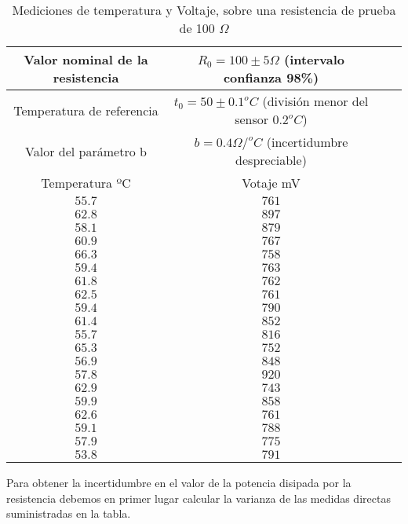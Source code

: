 \begin{table}[h]
\caption{Mediciones de temperatura y Voltaje, sobre una resistencia de prueba de 100 $\Omega$}
\label{tabres}
\centering
\begin{tabular}{cccc}
\hline
Valor nominal de la resistencia& $R_0=100 \pm 5 \Omega$ (intervalo confianza 98\%) \\ 
\hline
Temperatura de referencia& $t_0=50\pm 0.1 ^oC$ (división menor del sensor $0.2^oC$) \\
\hline
Valor del parámetro b& $b = 0.4\Omega / ^oC$ (incertidumbre despreciable)\\
\hline
\hline
Temperatura ºC& Votaje mV\\
\hline
 $55.7$&$761$\\
\hline 
 $62.8$&$897$\\
\hline 
 $58.1$&$879$\\
\hline 
 $60.9$&$767$\\
\hline 
 $66.3$&$758$\\
\hline 
 $59.4$&$763$\\
\hline 
 $61.8$&$762$\\
\hline 
 $62.5$&$761$\\
\hline 
 $59.4$&$790$\\
\hline 
 $61.4$&$852$\\
\hline 
 $55.7$&$816$\\
\hline 
 $65.3$&$752$\\
\hline 
 $56.9$&$848$\\
\hline 
 $57.8$&$920$\\
\hline 
 $62.9$&$743$\\
\hline 
 $59.9$&$858$\\
\hline 
 $62.6$&$761$\\
\hline 
 $59.1$&$788$\\
\hline 
 $57.9$&$775$\\
\hline
 $53.8$&$791$\\
\hline
\hline
\end{tabular}
\end{table}

Para obtener la incertidumbre en el valor de la potencia disipada por la resistencia debemos en primer lugar calcular la varianza de las medidas directas suministradas en la tabla.

